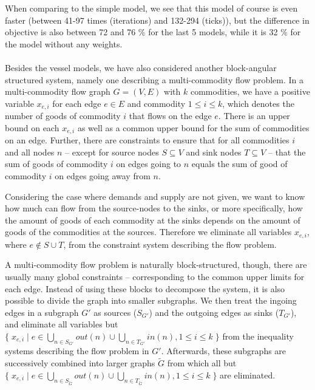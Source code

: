 When comparing to the simple model, we see that this model of course is even faster (between 41-97 times (iterations) and 132-294 (ticks)), but the difference in objective is also between 72 and 76 \% for the last 5 models, while it is 32 \% for the model without any weights. 
\\\\
Besides the vessel models, we have also considered another block-angular structured system, namely one describing a multi-commodity flow problem. In a multi-commodity flow graph $G=(V,E)$ with $k$ commodities, we have a positive variable $x_{e,i}$ for each edge $e\in E$ and commodity $1\leq i\leq k$, which denotes the number of goods of commodity $i$ that flows on the edge $e$. There is an upper bound on each $x_{e,i}$ as well as a common upper bound for the sum of commodities on an edge. Further, there are constraints to ensure that for all commodities $i$ and all nodes $n$ -- except for source nodes $S\subseteq V$ and sink nodes $T\subseteq V$ -- that the sum of goods of commodity $i$ on edges going to $n$ equals the sum of good of commodity $i$ on edges going away from $n$.

Considering the case where demands and supply are not given, we want to know how much can flow from the source-nodes to the sinks, or more specifically, how the amount of goods of each commodity at the sinks depends on the amount of goods of the commodities at the sources. Therefore we eliminate all variables $x_{e,i}$, where $e\notin S\cup T$, from the constraint system describing the flow problem.
		
A multi-commodity flow problem is naturally block-structured, though, there are usually many global constraints -- corresponding to the common upper limits for each edge. Instead of using these blocks to decompose the system, it is also possible to divide the graph into smaller subgraphs. We then treat the ingoing edges in a subgraph $G'$ as sources ($S_{G'}$) and the outgoing edges as sinks ($T_{G'}$), and eliminate all variables but $\{\;x_{e,i}\;|\; e\in \bigcup_{n\in S_{G'}}out(n)\cup \bigcup_{n\in T_{G'}}in(n), 1\leq i\leq k\;\}$ from the inequality systems describing the flow problem in $G'$. Afterwards, these  subgraphs are successively combined into larger graphs $\tilde{G}$ from which all but $\{\;x_{e,i}\;|\; e\in \bigcup_{n\in S_{\tilde G}}out(n)\cup \bigcup_{n\in T_{\tilde G}}in(n), 1\leq i\leq k\;\}$ are eliminated. 


